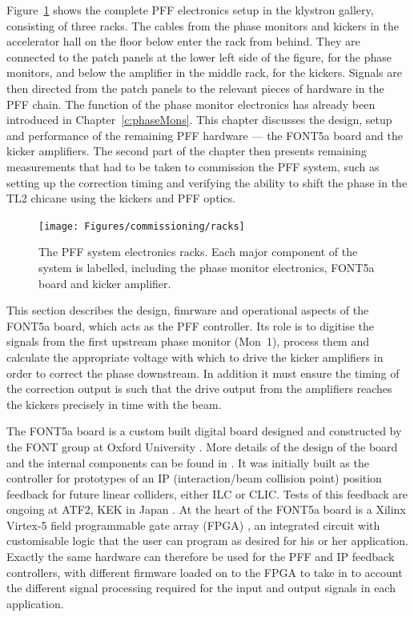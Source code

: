 
Figure~\ref{f:racks} shows the complete PFF electronics setup in the klystron gallery, consisting of three racks. The cables from the phase monitors and kickers in the accelerator hall on the floor below enter the rack from behind. They are connected to the patch panels at the lower left side of the figure, for the phase monitors, and below the amplifier in the middle rack, for the kickers. Signals are then directed from the patch panels to the relevant pieces of hardware in the PFF chain. The function of the phase monitor electronics has already been introduced in Chapter~\ref{c:phaseMons}. This chapter discusses the design, setup and performance of the remaining PFF hardware --- the FONT5a board and the kicker amplifiers. The second part of the chapter then presents remaining measurements that had to be taken to commission the PFF system, such as setting up the correction timing and verifying the ability to shift the phase in the TL2 chicane using the kickers and PFF optics.

\begin{figure}
  \centering
  \texttt{[image: Figures/commissioning/racks]}
  \caption{The PFF system electronics racks. Each major component of the system is labelled, including the phase monitor electronics, FONT5a board and kicker amplifier.}
  \label{f:racks}
\end{figure}


This section describes the design, fimrware and operational aspects of the FONT5a board, which acts as the PFF controller. Its role is to digitise the signals from the first upstream phase monitor (Mon~1), process them and calculate the appropriate voltage with which to drive the kicker amplifiers in order to correct the phase downstream. In addition it must ensure the timing of the correction output is such that the drive output from the amplifiers reaches the kickers precisely in time with the beam.

The FONT5a board is a custom built digital board designed and constructed by the FONT group at Oxford University \cite{fontGroup}. More details of the design of the board and the internal components can be found in \cite{dougThesis}. It was initially built as the controller for prototypes of an IP (interaction/beam collision point) position feedback for future linear colliders, either ILC or CLIC. Tests of this feedback are ongoing at ATF2, KEK in Japan  \cite{ipfbIPAC16}. At the heart of the FONT5a board is a Xilinx Virtex-5 field programmable gate array (FPGA) \cite{xilinx}, an integrated circuit with customisable logic that the user can program as desired for his or her application. Exactly the same hardware can therefore be used for the PFF and IP feedback controllers, with different firmware loaded on to the FPGA to take in to account the different signal processing required for the input and output signals in each application.

